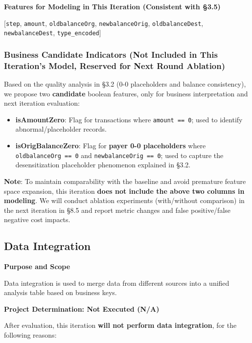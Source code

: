 \documentclass[sigplan,screen]{acmart}
\begin{document}
\textbf{Features for Modeling in This Iteration (Consistent with \S3.5)}

[\texttt{step}, \texttt{amount}, \texttt{oldbalanceOrg}, \texttt{newbalanceOrig}, \texttt{oldbalanceDest}, \texttt{newbalanceDest}, \texttt{type\_encoded}]

\subsubsection{Business Candidate Indicators (Not Included in This Iteration's Model, Reserved for Next Round Ablation)}

Based on the quality analysis in \S3.2 (0-0 placeholders and balance consistency), we propose two \textbf{candidate} boolean features, only for business interpretation and next iteration evaluation:

\begin{itemize}
    \item \textbf{isAmountZero}: Flag for transactions where \texttt{amount == 0}; used to identify abnormal/placeholder records.
    \item \textbf{isOrigBalanceZero}: Flag for \textbf{payer 0-0 placeholders} where \texttt{oldbalanceOrg == 0} and \texttt{newbalanceOrig == 0}; used to capture the desensitization placeholder phenomenon explained in \S3.2.
    \end{itemize}
    
\textbf{Note}: To maintain comparability with the baseline and avoid premature feature space expansion, this iteration \textbf{does not include the above two columns in modeling}. We will conduct ablation experiments (with/without comparison) in the next iteration in \S8.5 and report metric changes and false positive/false negative cost impacts.

\subsection{Data Integration}

\textbf{Purpose and Scope}

Data integration is used to merge data from different sources into a unified analysis table based on business keys.

\textbf{Project Determination: Not Executed (N/A)}

After evaluation, this iteration \textbf{will not perform data integration}, for the following reasons:
\end{document}
